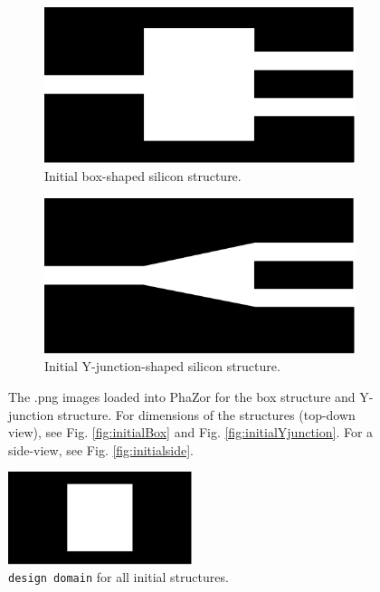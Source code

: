 \begin{figure}[t]
    \centering
    \begin{subfigure}[h]{0.48\textwidth}
        \centering
        \includegraphics[width=\textwidth]
        {fig/design/stanford.pdf}
        \caption{Initial box-shaped silicon structure.}
        \label{fig:stanford}
    \end{subfigure}
    \hspace{1mm}
    \begin{subfigure}[h]{0.48\textwidth}
        \centering
        \includegraphics[width=\textwidth]
        {fig/design/stanford_Yjunction.pdf}
    \caption{Initial Y-junction-shaped silicon structure.}
    \label{stanford_Yjunction}
    \end{subfigure}
    \caption{The .png images loaded into PhaZor for the box structure and Y-junction structure. For dimensions of the structures (top-down view), see Fig. \ref{fig:initialBox} and Fig. \ref{fig:initialYjunction}. For a side-view, see Fig. \ref{fig:initialside}.}
    \label{fig:Inputfiles}
\end{figure}

\begin{figure}[h]
    \centering
    \includegraphics[width=0.48\textwidth]
        {fig/design/stanford_DD.pdf}
        \caption{\texttt{design domain} for all initial structures.}
        \label{fig:stanford_DD}
\end{figure}


